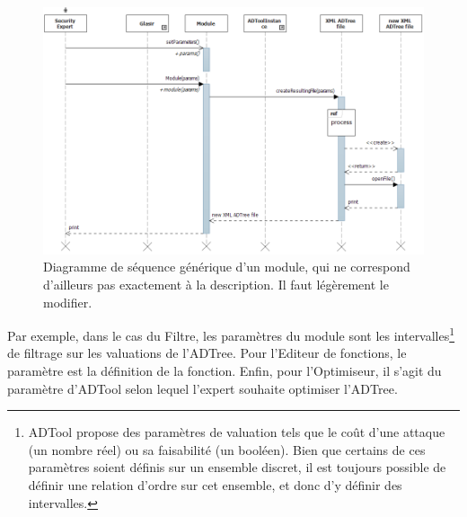 	    \begin{figure}[H]
	        \centering
	        \includegraphics[height=0.75\textwidth]{figure/moduleSeqDiag.png}
	        \caption{Diagramme de séquence générique d'un module, qui ne correspond d'ailleurs pas exactement à la description. Il faut légèrement le modifier.}
	        \label{fig:moduleseq}
	    \end{figure}

Par exemple, dans le cas du Filtre, les paramètres du module sont les intervalles\footnote{ADTool propose des paramètres de valuation tels que le coût d'une attaque (un nombre réel) ou sa faisabilité (un booléen). Bien que certains de ces paramètres soient définis sur un ensemble discret, il est toujours possible de définir une relation d'ordre sur cet ensemble, et donc d'y définir des intervalles.} de filtrage sur les valuations de l'ADTree. Pour l'Editeur de fonctions, le paramètre est la définition de la fonction. Enfin, pour l'Optimiseur, il s'agit du paramètre d'ADTool selon lequel l'expert souhaite optimiser l'ADTree.